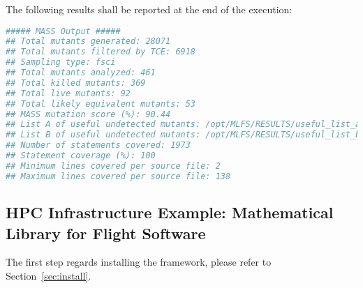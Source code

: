 The following results shall be reported at the end of the execution:

\begin{lstlisting}[language=bash]
##### MASS Output #####                                                                                                                   
## Total mutants generated: 28071
## Total mutants filtered by TCE: 6918
## Sampling type: fsci
## Total mutants analyzed: 461
## Total killed mutants: 369
## Total live mutants: 92
## Total likely equivalent mutants: 53
## MASS mutation score (%): 90.44
## List A of useful undetected mutants: /opt/MLFS/RESULTS/useful_list_a
## List B of useful undetected mutants: /opt/MLFS/RESULTS/useful_list_b
## Number of statements covered: 1973
## Statement coverage (%): 100
## Minimum lines covered per source file: 2
## Maximum lines covered per source file: 138
\end{lstlisting}


\subsection{HPC Infrastructure Example: Mathematical Library for Flight Software}

The first step regards installing the \MASS framework, please refer to Section~\ref{sec:install}.

